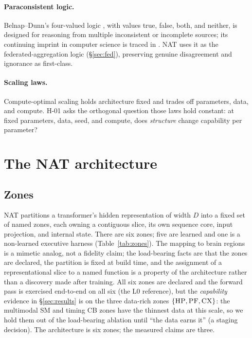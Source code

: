\documentclass[11pt]{article}
\newcommand{\zone}[1]{\textsc{#1}}
\begin{document}
\paragraph{Paraconsistent logic.}
Belnap--Dunn's four-valued logic \citep{belnap1977useful}, with values true, false, both, and
neither, is designed for reasoning from multiple inconsistent or incomplete sources; its continuing
imprint in computer science is traced in \citet{jakl2025four}. NAT uses it as the
federated-aggregation logic (\S\ref{sec:fed}), preserving genuine disagreement and ignorance as
first-class.

\paragraph{Scaling laws.}
Compute-optimal scaling \citep{hoffmann2022training,kaplan2020scaling} holds architecture fixed and
trades off parameters, data, and compute. H-01 asks the orthogonal question those laws hold constant:
at fixed parameters, data, seed, and compute, does \emph{structure} change capability per parameter?

\section{The NAT architecture}\label{sec:arch}

\subsection{Zones}
NAT partitions a transformer's hidden representation of width $D$ into a fixed set of named zones,
each owning a contiguous slice, its own sequence core, input projection, and internal state. There
are six zones; five are learned and one is a non-learned executive harness (Table~\ref{tab:zones}).
The mapping to brain regions is a mimetic analog, not a fidelity claim; the load-bearing facts are
that the zones are declared, the partition is fixed at build time, and the assignment of a
representational slice to a named function is a property of the architecture rather than a discovery
made after training. All six zones are declared and the forward pass is exercised end-to-end on all
six (the L0 reference), but the \emph{capability} evidence in \S\ref{sec:results} is on the three
data-rich zones $\{\zone{HP},\zone{PF},\zone{CX}\}$: the multimodal \zone{SM} and timing \zone{CB} zones
have the thinnest data at this scale, so we hold them out of the load-bearing ablation until ``the
data earns it'' (a staging decision). The architecture is six zones; the measured claims are three.
\end{document}
